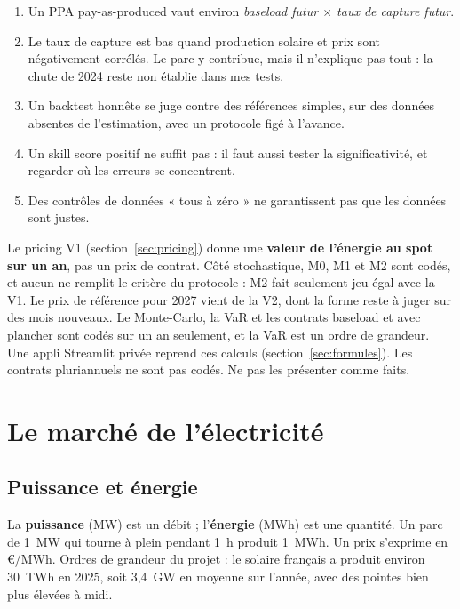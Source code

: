 \documentclass[11pt,a4paper]{article}
\begin{document}
\begin{enumerate}
\item Un PPA pay-as-produced vaut environ \emph{baseload futur $\times$ taux de capture futur}.
\item Le taux de capture est bas quand production solaire et prix sont négativement corrélés. Le parc y contribue, mais il
n'explique pas tout : la chute de 2024 reste non établie dans mes tests.
\item Un backtest honnête se juge contre des références simples, sur des données absentes de l'estimation, avec un
protocole figé à l'avance.
\item Un skill score positif ne suffit pas : il faut aussi tester la significativité, et regarder où
les erreurs se concentrent.
\item Des contrôles de données « tous à zéro » ne garantissent pas que les données sont justes.
\end{enumerate}

\begin{attention}
Le pricing V1 (section~\ref{sec:pricing}) donne une \textbf{valeur de l'énergie au spot sur un an}, pas un prix de
contrat. Côté stochastique, M0, M1 et M2 sont codés, et aucun ne remplit le critère du protocole : M2 fait seulement jeu égal avec la V1. Le prix de référence pour 2027 vient de la V2, dont la forme reste à juger sur des mois nouveaux. Le Monte-Carlo, la VaR et les contrats baseload et avec plancher sont codés sur un an seulement, et la VaR est un ordre de grandeur. Une appli Streamlit privée reprend ces calculs (section~\ref{sec:formules}). Les contrats pluriannuels ne sont pas codés. Ne pas les présenter comme faits.
\end{attention}

\section{Le marché de l'électricité}

\subsection{Puissance et énergie}

La \textbf{puissance} (MW) est un débit ; l'\textbf{énergie} (MWh) est une quantité. Un parc de 1~MW qui
tourne à plein pendant 1~h produit 1~MWh. Un prix s'exprime en €/MWh. Ordres de grandeur du projet : le
solaire français a produit environ 30~TWh en 2025, soit 3,4~GW en moyenne sur l'année, avec des pointes
bien plus élevées à midi.
\end{document}
